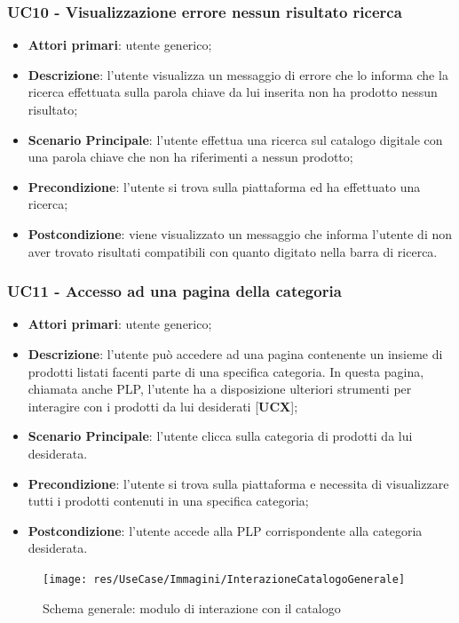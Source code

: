 \subsubsection{UC10 - Visualizzazione errore nessun risultato ricerca}
\begin{itemize}
\item \textbf{Attori primari}: utente generico;
\item \textbf{Descrizione}: l'utente visualizza un messaggio di errore che lo informa che la ricerca effettuata sulla parola chiave da lui inserita non ha prodotto nessun risultato;
\item \textbf{Scenario Principale}: l'utente effettua una ricerca sul catalogo digitale con una parola chiave che non ha riferimenti a nessun prodotto;
\item \textbf{Precondizione}: l'utente si trova sulla piattaforma ed ha effettuato una ricerca;
\item \textbf{Postcondizione}: viene visualizzato un messaggio che informa l'utente di non aver trovato risultati compatibili con quanto digitato nella barra di ricerca.
\end{itemize}
\subsubsection{UC11 - Accesso ad una pagina della categoria}
\begin{itemize}
\item \textbf{Attori primari}: utente generico;
\item \textbf{Descrizione}: l'utente può accedere ad una pagina contenente un insieme di prodotti listati facenti parte di una specifica categoria. In questa pagina, chiamata anche PLP, l'utente ha a disposizione ulteriori strumenti per interagire con i prodotti da lui desiderati [\textbf{UCX}];
\item \textbf{Scenario Principale}: l'utente clicca sulla categoria di prodotti da lui desiderata.
\item \textbf{Precondizione}: l'utente si trova sulla piattaforma e necessita di visualizzare tutti i prodotti contenuti in una specifica categoria;
\item \textbf{Postcondizione}: l'utente accede alla PLP corrispondente alla categoria desiderata.
\end{itemize}
\begin{figure}[H]
\centering
\texttt{[image: res/UseCase/Immagini/InterazioneCatalogoGenerale]}
\caption{Schema generale: modulo di interazione con il catalogo}
\end{figure}